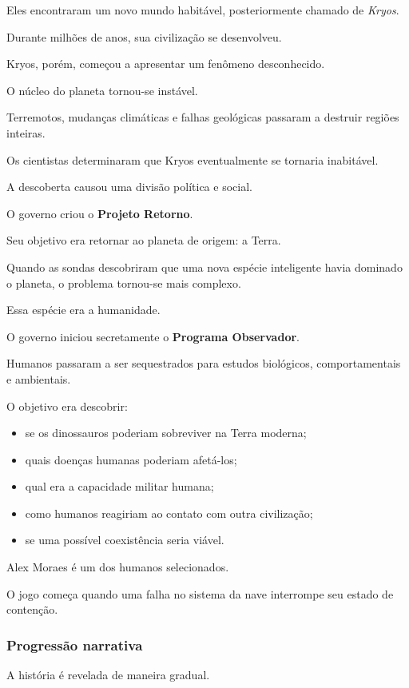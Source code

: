 \documentclass[12pt,a4paper]{article}
\begin{document}
Eles encontraram um novo mundo habitável, posteriormente chamado de
\textit{Kryos}.

Durante milhões de anos, sua civilização se desenvolveu.

Kryos, porém, começou a apresentar um fenômeno desconhecido.

O núcleo do planeta tornou-se instável.

Terremotos, mudanças climáticas e falhas geológicas passaram a
destruir regiões inteiras.

Os cientistas determinaram que Kryos eventualmente se tornaria
inabitável.

A descoberta causou uma divisão política e social.

O governo criou o \textbf{Projeto Retorno}.

Seu objetivo era retornar ao planeta de origem: a Terra.

Quando as sondas descobriram que uma nova espécie inteligente havia
dominado o planeta, o problema tornou-se mais complexo.

Essa espécie era a humanidade.

O governo iniciou secretamente o \textbf{Programa Observador}.

Humanos passaram a ser sequestrados para estudos biológicos,
comportamentais e ambientais.

O objetivo era descobrir:

\begin{itemize}
    \item se os dinossauros poderiam sobreviver na Terra moderna;
    \item quais doenças humanas poderiam afetá-los;
    \item qual era a capacidade militar humana;
    \item como humanos reagiriam ao contato com outra civilização;
    \item se uma possível coexistência seria viável.
\end{itemize}

Alex Moraes é um dos humanos selecionados.

O jogo começa quando uma falha no sistema da nave interrompe seu
estado de contenção.

\subsubsection*{Progressão narrativa}

A história é revelada de maneira gradual.
\end{document}
